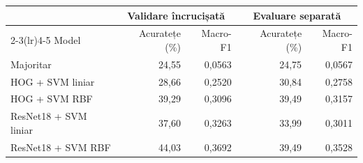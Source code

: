\begin{tabular}{lrrrr}
\toprule
& \multicolumn{2}{c}{Validare încrucișată} & \multicolumn{2}{c}{Evaluare separată} \\
\cmidrule(lr){2-3}\cmidrule(lr){4-5}
Model & Acuratețe (\%) & Macro-F1 & Acuratețe (\%) & Macro-F1 \\
\midrule
Majoritar & 24,55 & 0,0563 & 24,75 & 0,0567 \\
HOG + SVM liniar & 28,66 & 0,2520 & 30,84 & 0,2758 \\
HOG + SVM RBF & 39,29 & 0,3096 & 39,49 & 0,3157 \\
ResNet18 + SVM liniar & 37,60 & 0,3263 & 33,99 & 0,3011 \\
ResNet18 + SVM RBF & 44,03 & 0,3692 & 39,49 & 0,3528 \\
\bottomrule
\end{tabular}
